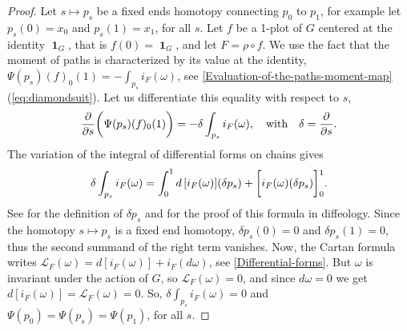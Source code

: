 \documentclass[10pt,reqno,twoside]{amsart}
\newcommand{\qmbox}[1]{\quad\mbox{#1}\quad}
\DeclareMathOperator{\id}{\mathbf{1}}
\newcommand{\DLie}{\mathcal{L}} %
\theoremstyle{plain}
\theoremstyle{definition}
\begin{document}
  \begin{proof}
    Let $s \mapsto p_s$ be a fixed ends homotopy connecting $p_0$ to $p_1$,
    for example let $p_s(0)=x_0$ and $p_s(1) = x_1$,
    for all $s$.
    Let $f$ be a 1-plot of $G$ centered at the identity $\id_G$,
    that is $f(0) = \id_G$,
    and let $F = \rho \circ f$.
    We use the fact that the moment of paths is characterized by its value at the identity,
    $\Psi(p_s)(f)_0(1) = -\displaystyle\int_{p_s} i_F(\omega)$,
    see \ref{Evaluation-of-the-paths-moment-map} (\ref{eq:diamondsuit}).
    Let us differentiate this equality with respect to $s$,
    $$
      {\partial \over \partial s}\bigg(\Psi(p_s)(f)_0(1)\bigg) = - \delta \int_{p_s} i_F (\omega), \qmbox{with} \delta = {\partial \over \partial s}.
      $$
    The variation of the integral of differential forms on chains gives
    $$
      \delta \int_{p_s} i_F (\omega) =
      \int_0^1 d\,[i_F(\omega)] ( \delta p_s ) +
      \bigg[ i_F(\omega) ( \delta
      p_s)\bigg]_{\raisebox{1pt}{\scriptsize
      0}}^{\raisebox{-2pt}{\scriptsize
      1}}.
      $$
    See \cite{Piz05} for the definition of $\delta p_s$ and for the proof of this formula in diffeology.
    Since the homotopy $s \mapsto p_s$ is a fixed end homotopy,
    $\delta p_s(0) = 0$ and $\delta p_s(1) = 0$,
    thus the second summand of the right term vanishes.
    Now,
    the Cartan formula writes $\DLie_F(\omega) = d[i_F(\omega)]+i_F(d\omega)$,
    see \ref{Differential-forms}.
    But $\omega$ is invariant under the action of $G$,
    so $\DLie_F(\omega) =0$,
    and since $d\omega = 0$ we get $d[i_F(\omega)] = \DLie_F(\omega) = 0$.
    So,
    $\delta {\displaystyle \int_{p_s}} i_F (\omega) = 0$ and $\Psi(p_0) = \Psi(p_s) = \Psi(p_1)$,
    for all $s$.
  \end{proof}
  
\end{document}
